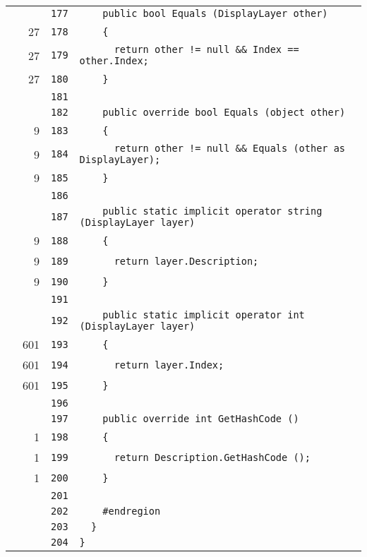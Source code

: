 \documentclass[a4paper,10pt]{article}
\begin{document}
\begin{longtable}[l]{lrrl}
\cellcolor{gray} &  & \verb~177~ & \verb~    public bool Equals (DisplayLayer other)~\\
\cellcolor{green} & 27 & \verb~178~ & \verb~    {~\\
\cellcolor{green} & 27 & \verb~179~ & \verb~      return other != null && Index == other.Index;~\\
\cellcolor{green} & 27 & \verb~180~ & \verb~    }~\\
\cellcolor{gray} &  & \verb~181~ & \verb~~\\
\cellcolor{gray} &  & \verb~182~ & \verb~    public override bool Equals (object other)~\\
\cellcolor{green} & 9 & \verb~183~ & \verb~    {~\\
\cellcolor{green} & 9 & \verb~184~ & \verb~      return other != null && Equals (other as DisplayLayer);~\\
\cellcolor{green} & 9 & \verb~185~ & \verb~    }~\\
\cellcolor{gray} &  & \verb~186~ & \verb~~\\
\cellcolor{gray} &  & \verb~187~ & \verb~    public static implicit operator string (DisplayLayer layer)~\\
\cellcolor{green} & 9 & \verb~188~ & \verb~    {~\\
\cellcolor{green} & 9 & \verb~189~ & \verb~      return layer.Description;~\\
\cellcolor{green} & 9 & \verb~190~ & \verb~    }~\\
\cellcolor{gray} &  & \verb~191~ & \verb~~\\
\cellcolor{gray} &  & \verb~192~ & \verb~    public static implicit operator int (DisplayLayer layer)~\\
\cellcolor{green} & 601 & \verb~193~ & \verb~    {~\\
\cellcolor{green} & 601 & \verb~194~ & \verb~      return layer.Index;~\\
\cellcolor{green} & 601 & \verb~195~ & \verb~    }~\\
\cellcolor{gray} &  & \verb~196~ & \verb~~\\
\cellcolor{gray} &  & \verb~197~ & \verb~    public override int GetHashCode ()~\\
\cellcolor{green} & 1 & \verb~198~ & \verb~    {~\\
\cellcolor{green} & 1 & \verb~199~ & \verb~      return Description.GetHashCode ();~\\
\cellcolor{green} & 1 & \verb~200~ & \verb~    }~\\
\cellcolor{gray} &  & \verb~201~ & \verb~~\\
\cellcolor{gray} &  & \verb~202~ & \verb~    #endregion~\\
\cellcolor{gray} &  & \verb~203~ & \verb~  }~\\
\cellcolor{gray} &  & \verb~204~ & \verb~}~\\
\end{longtable}
\newpage
\end{document}
